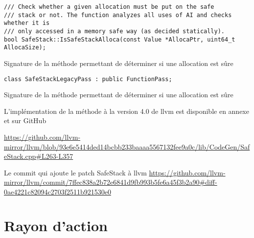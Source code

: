 \begin{listing}
	\begin{verbatim}
/// Check whether a given allocation must be put on the safe
/// stack or not. The function analyzes all uses of AI and checks whether it is
/// only accessed in a memory safe way (as decided statically).
bool SafeStack::IsSafeStackAlloca(const Value *AllocaPtr, uint64_t AllocaSize);
	\end{verbatim}
	\caption{Signature de la méthode permettant de déterminer si une allocation est sûre}
	\label{lst:IsSafeStackAllocaHeader}
\end{listing}

\begin{listing}
	\begin{verbatim}
class SafeStackLegacyPass : public FunctionPass;
	\end{verbatim}
	\caption{Signature de la méthode permettant de déterminer si une allocation est sûre}
	\label{lst:SafeStackLegacyPassClass}
\end{listing}






L'implémentation de la méthode à la version 4.0 de \gls{llvm} est disponible en annexe et sur GitHub

\url{https://github.com/llvm-mirror/llvm/blob/93e6e5414ded14bcbb233baaaa5567132fee9a0c/lib/CodeGen/SafeStack.cpp#L263-L357}



Le commit qui ajoute le patch SafeStack à llvm
\url{https://github.com/llvm-mirror/llvm/commit/7ffec838a2b72e6841d9fb993b5fe6a45f3b2a90#diff-0ae4221c82094c2703f2511b921530e0}



\section{Rayon d'action}

